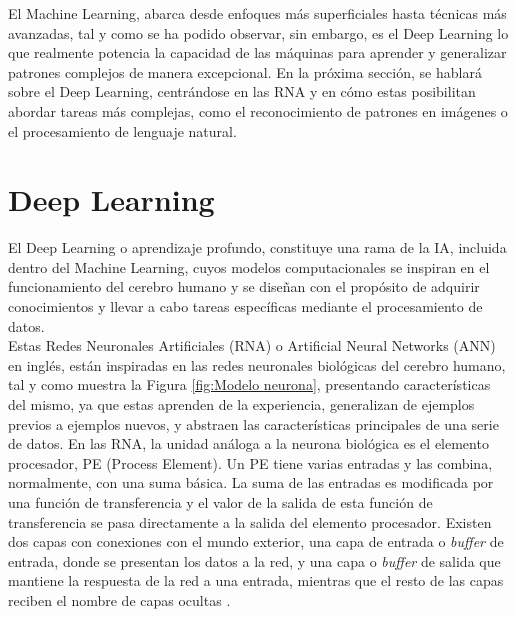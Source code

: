 El Machine Learning, abarca desde enfoques más superficiales hasta técnicas más avanzadas, tal y como se ha podido observar, sin embargo, es el Deep Learning lo que realmente potencia la capacidad de las máquinas para aprender y generalizar patrones complejos de manera excepcional. En la próxima sección, se hablará sobre el Deep Learning, centrándose en las RNA y en cómo estas posibilitan abordar tareas más complejas, como el reconocimiento de patrones en imágenes o el procesamiento de lenguaje natural.


\section{Deep Learning}
\label{sec:DeepLearning} 
El Deep Learning o aprendizaje profundo, constituye una rama de la IA, incluida dentro del Machine Learning, cuyos modelos computacionales se inspiran en el funcionamiento del cerebro humano y se diseñan con el propósito de adquirir conocimientos y llevar a cabo tareas específicas mediante el procesamiento de datos.\\ %

Estas Redes Neuronales Artificiales (RNA) o Artificial Neural Networks (ANN) en inglés, están inspiradas en las redes neuronales biológicas del cerebro humano, tal y como muestra la Figura \ref{fig:Modelo neurona}, presentando características del mismo, ya que estas aprenden de la experiencia, generalizan de ejemplos previos a ejemplos nuevos, y abstraen las características principales de una serie de datos. En las RNA, la unidad análoga a la neurona biológica es el elemento procesador, PE (Process Element). Un PE tiene varias entradas y las combina, normalmente, con una suma básica. La suma de las entradas es modificada por una función de transferencia y el valor de la salida de esta función de transferencia se pasa directamente a la salida del elemento procesador. Existen dos capas con conexiones con el mundo exterior, una capa de entrada o \textit{buffer} de entrada, donde se presentan los datos a la red, y una capa o \textit{buffer} de salida que mantiene la respuesta de la red a una entrada, mientras que el resto de las capas reciben el nombre de capas ocultas \cite{Basogain08}.\\

